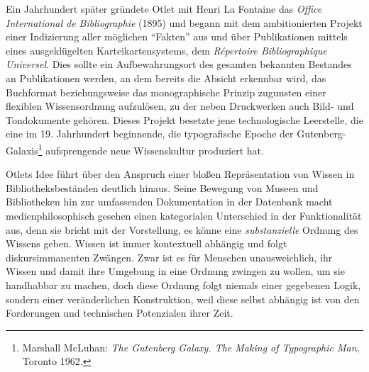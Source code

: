 Ein Jahrhundert später gründete Otlet mit Henri La Fontaine das
\emph{Office International de Bibliographie} (1895) und begann mit dem
ambitionierten Projekt einer Indizierung aller möglichen
\enquote{Fakten} aus und über Publikationen mittels eines ausgeklügelten
Karteikartensystems, dem \emph{Répertoire Bibliographique Universel}.
Dies sollte ein Aufbewahrungsort des gesamten bekannten Bestandes an
Publikationen werden, an dem bereits die Absicht erkennbar wird, das
Buchformat beziehungsweise das monographische Prinzip zugunsten einer
flexiblen Wissensordnung aufzulösen, zu der neben Druckwerken auch Bild-
und Tondokumente gehören. Dieses Projekt besetzte jene technologische
Leerstelle, die eine im 19. Jahrhundert beginnende, die typografische
Epoche der Gutenberg-Galaxis\footnote{Marshall McLuhan: \emph{The
  Gutenberg Galaxy. The Making of Typographic Man}, Toronto 1962.}
aufsprengende neue Wissenskultur produziert hat.

Otlets Idee führt über den Anspruch einer bloßen Repräsentation von
Wissen in Bibliotheksbeständen deutlich hinaus. Seine Bewegung von
Museen und Bibliotheken hin zur umfassenden Dokumentation in der
Datenbank macht medienphilosophisch gesehen einen kategorialen
Unterschied in der Funktionalität aus, denn sie bricht mit der
Vorstellung, es könne eine \emph{substanzielle} Ordnung des Wissens
geben. Wissen ist immer kontextuell abhängig und folgt diskursimmanenten
Zwängen. Zwar ist es für Menschen unausweichlich, ihr Wissen und damit
ihre Umgebung in eine Ordnung zwingen zu wollen, um sie handhabbar zu
machen, doch diese Ordnung folgt niemals einer gegebenen Logik, sondern
einer veränderlichen Konstruktion, weil diese selbst abhängig ist von
den Forderungen und technischen Potenzialen ihrer Zeit.

